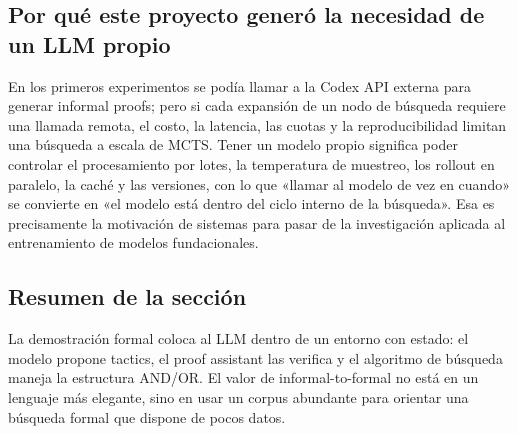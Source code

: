 \subsection{Por qué este proyecto generó la necesidad de un LLM propio}

En los primeros experimentos se podía llamar a la Codex API externa para generar informal proofs; pero si cada expansión de un nodo de búsqueda requiere una llamada remota, el costo, la latencia, las cuotas y la reproducibilidad limitan una búsqueda a escala de MCTS. Tener un modelo propio significa poder controlar el procesamiento por lotes, la temperatura de muestreo, los rollout en paralelo, la caché y las versiones, con lo que «llamar al modelo de vez en cuando» se convierte en «el modelo está dentro del ciclo interno de la búsqueda». Esa es precisamente la motivación de sistemas para pasar de la investigación aplicada al entrenamiento de modelos fundacionales.

\subsection{Resumen de la sección}

La demostración formal coloca al LLM dentro de un entorno con estado: el modelo propone tactics, el proof assistant las verifica y el algoritmo de búsqueda maneja la estructura AND/OR. El valor de informal-to-formal no está en un lenguaje más elegante, sino en usar un corpus abundante para orientar una búsqueda formal que dispone de pocos datos.

